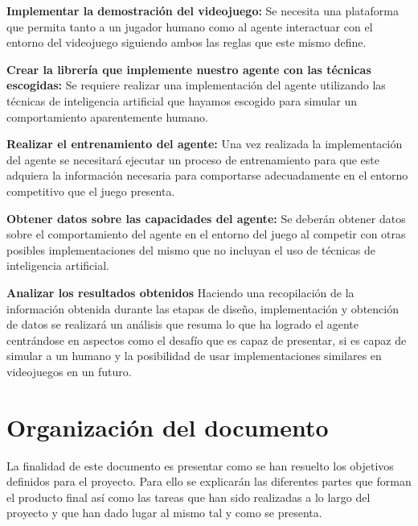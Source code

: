 \begin{enumerate}
	
	{\item {\bf Implementar la demostración del videojuego:}
		Se necesita una plataforma que permita tanto a un jugador humano como al agente interactuar con el entorno del videojuego siguiendo ambos las reglas que este mismo define.
	}

	{\item {\bf Crear la librería que implemente nuestro agente con las técnicas escogidas:}
		Se requiere realizar una implementación del agente utilizando las técnicas de inteligencia artificial que hayamos escogido para simular un comportamiento aparentemente humano.
	}

	{\item {\bf Realizar el entrenamiento del agente:}
		Una vez realizada la implementación del agente se necesitará ejecutar un proceso de entrenamiento para que este adquiera la información necesaria para comportarse adecuadamente en el entorno competitivo que el juego presenta.
	}

	{\item {\bf Obtener datos sobre las capacidades del agente:}
		Se deberán obtener datos sobre el comportamiento del agente en el entorno del juego al competir con otras posibles implementaciones del mismo que no incluyan el uso de técnicas de inteligencia artificial.
	}

	{\item {\bf Analizar los resultados obtenidos}
		Haciendo una recopilación de la información obtenida durante las etapas de diseño, implementación y obtención de datos se realizará un análisis que resuma lo que ha logrado el agente centrándose en aspectos como el desafío que es capaz de presentar, si es capaz de simular a un humano y la posibilidad de usar implementaciones similares en videojuegos en un futuro.
	}
	
\end{enumerate}

\section{Organización del documento}

La finalidad de este documento es presentar como se han resuelto los objetivos definidos para el proyecto. Para ello se explicarán las diferentes partes que forman el producto final así como las tareas que han sido realizadas a lo largo del proyecto y que han dado lugar al mismo tal y como se presenta.




